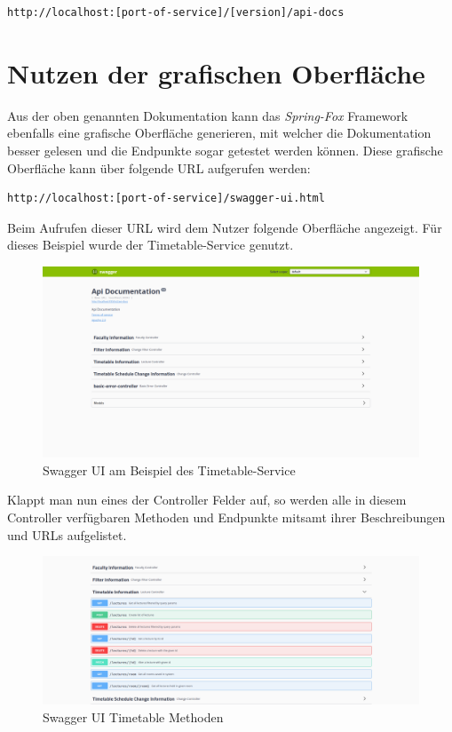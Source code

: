 \begin{lstlisting}[caption={Swagger Export URL}]
http://localhost:[port-of-service]/[version]/api-docs
\end{lstlisting}

\section{Nutzen der grafischen Oberfläche}

Aus der oben genannten Dokumentation kann das \textit{Spring-Fox} Framework ebenfalls eine grafische Oberfläche generieren, mit welcher die Dokumentation besser gelesen und die Endpunkte sogar getestet werden können. Diese grafische Oberfläche kann über folgende \ac{URL} aufgerufen werden:

\begin{lstlisting}[caption={Swagger Export URL}]
http://localhost:[port-of-service]/swagger-ui.html
\end{lstlisting}

Beim Aufrufen dieser \ac{URL} wird dem Nutzer folgende Oberfläche angezeigt. Für dieses Beispiel wurde der Timetable-Service genutzt.

\begin{figure}[H]
\centering
\includegraphics[width=14 cm]{Bilder/Kapitel_6/swagger_ui.png}
\caption{Swagger UI am Beispiel des Timetable-Service\label{fig:swagger_ui}}
\end{figure}

Klappt man nun eines der Controller Felder auf, so werden alle in diesem Controller verfügbaren Methoden und Endpunkte mitsamt ihrer Beschreibungen und \acp{URL} aufgelistet.

\begin{figure}[H]
\centering
\includegraphics[width=14 cm]{Bilder/Kapitel_6/swagger_ui_methoden.png}
\caption{Swagger UI Timetable Methoden\label{fig:swagger_ui_methods}}
\end{figure}

